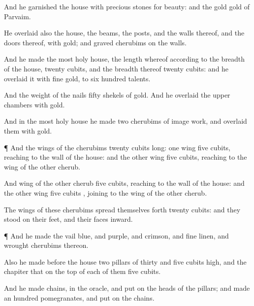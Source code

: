 {And he
garnished the
house with
precious
stones for
beauty: and the
gold
{}
gold of
Parvaim.

He
overlaid also the
house, the
beams, the
posts, and the
walls thereof, and the
doors thereof, with
gold; and
graved
cherubims on the
walls.

And he
made the
most
holy
house, the
length whereof
{} according
to the
breadth of the
house,
twenty
cubits, and the
breadth thereof
twenty
cubits: and he
overlaid it with
fine
gold,
{} to
six
hundred
talents.

And the
weight of the
nails
{}
fifty
shekels of
gold. And he
overlaid the upper
chambers with
gold.


\par }{\PP {}And in the
most
holy
house he
made
two
cherubims of
image
work, and
overlaid them with
gold.


\par }{\PP {}¶ And the
wings of the
cherubims
{}
twenty
cubits
long:
one
wing
{}
five
cubits,
reaching to the
wall of the
house: and the
other
wing
{}
five
cubits,
reaching to the
wing of the
other
cherub.

And
{}
wing of the
other
cherub
{}
five
cubits,
reaching to the
wall of the
house: and the
other
wing
{}
five
cubits
{},
joining to the
wing of the
other
cherub.

The
wings of these
cherubims spread themselves
forth
twenty
cubits: and they
stood on their
feet, and their
faces
{}
inward.


\par }{\PP {}¶ And he
made the
vail
{}
blue, and
purple, and
crimson, and fine
linen, and
wrought
cherubims thereon.

Also he
made
before the
house
two
pillars of
thirty and
five
cubits
high, and the
chapiter that
{} on the
top of each of them
{}
five
cubits.

And he
made
chains,
{} in the
oracle, and
put
{} on the
heads of the
pillars; and
made an
hundred
pomegranates, and
put
{} on the
chains.

}
